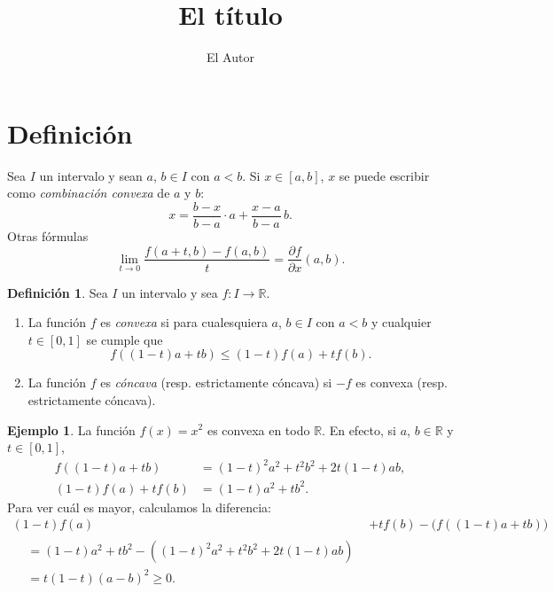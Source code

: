 \documentclass[11pt]{article}
\author{El Autor}
\title{El título}
\numberwithin{equation}{section}
\theoremstyle{plain}
\theoremstyle{definition}
\newtheorem{definicion}[teorema]{Definición}
\newtheorem{ejemplo}[teorema]{Ejemplo}
\theoremstyle{remark}
\begin{document}
\maketitle

\section{Definición}



Sea $I$ un intervalo y sean $a$, $b \in I$ con $a<b$. Si $x\in [a,b]$, $x$ se puede escribir como \emph{combinación convexa} de $a$ y $b$:
\[
 x= \frac{b-x}{b-a}\cdot a + \frac{x-a}{b-a}\, b.
\]
Otras fórmulas
\[
 \lim_{t \to 0} \frac{f(a+t,b)-f(a,b)}{t}= \frac{\partial f}{\partial x}(a,b).
\]



\begin{definicion}\label{def:convexa}
 Sea $I$ un intervalo y sea $f \colon I \rightarrow \mathbb{R}$.
 \begin{enumerate}
  \item La función $f$ es \emph{convexa} si para cualesquiera $a$, $b \in I$ con $a<b$ y cualquier $t \in [0,1]$ se cumple que
        \[
         f\left((1-t)a+tb\right) \leq (1-t)f(a)+tf(b).
        \]
  \item La función $f$ es \emph{cóncava} (resp. estrictamente cóncava) si $-f$ es convexa (resp. estrictamente cóncava).
 \end{enumerate}
\end{definicion}

\begin{ejemplo}
 La función $f(x)=x^2$ es convexa en todo $\mathbb{R}$. En efecto, si $a$, $b \in \mathbb{R}$ y $t \in [0,1]$,
 \begin{align*}
  f\left( (1-t)a+tb \right) & = (1-t)^2 a^{2}+t^{2}b^{2} +2t(1-t)ab, \\
  (1-t)f(a)+tf(b)           & = (1-t)a^2+tb^2.
 \end{align*}
 Para ver cuál es mayor, calculamos la diferencia:
 \begin{align*}
  (1-t)f(a) & +tf(b)  - \bigl( f\left( (1-t)a+tb \right) \bigr) \\
  \begin{split}
   & = (1-t)a^2+tb^2 - \left( (1-t)^2 a^{2}+t^{2}b^{2} +2t(1-t)ab \right) \\
   & = t(1-t) \left( a-b \right)^2 \geq 0.
  \end{split}
 \end{align*}
\end{ejemplo}
\end{document}
